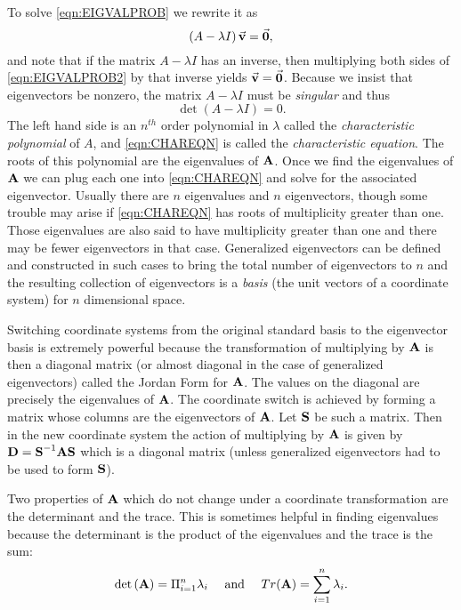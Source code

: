 To solve \eqref{eqn:EIGVALPROB} we rewrite it as
\begin{equation}
   \left(A - \lambda I\right) \vec{\textbf{v}} = \vec{\textbf{0}},
   \label{eqn:EIGVALPROB2}
\end{equation}
and note that if the matrix $A-\lambda I$ has an inverse, 
then multiplying both sides of \eqref{eqn:EIGVALPROB2} by that inverse yields $\vec{\textbf{v}}=\vec{\textbf{0}}$.
Because we insist that eigenvectors be nonzero,
the matrix $A-\lambda I$ must be \emph{singular} and thus
\begin{equation}
   \det\left(A-\lambda I\right) = 0.
   \label{eqn:CHAREQN}
\end{equation}
The left hand side is an $n^{th}$ order polynomial in $\lambda$ called
the \emph{characteristic polynomial}
of $A$, and
\eqref{eqn:CHAREQN} is 
called the \emph{characteristic equation}.
The roots of this polynomial are the eigenvalues of ${\textbf{A}}$.
Once we find the eigenvalues of ${\textbf{A}}$ we can plug each one into \eqref{eqn:CHAREQN}
and solve for the associated eigenvector.  Usually there are $n$ eigenvalues and
$n$ eigenvectors, though some trouble may arise if \eqref{eqn:CHAREQN} has roots
of multiplicity greater than one.  Those eigenvalues are also said to have multiplicity
greater than one and there may be fewer eigenvectors in that case.  Generalized
eigenvectors can be defined and constructed in such cases to bring the total
number of eigenvectors to $n$ and the resulting collection of eigenvectors is 
a \emph{basis} (the unit vectors of a coordinate system) for $n$ dimensional space.

Switching coordinate systems from the original standard basis to the eigenvector
basis is extremely powerful because the transformation of multiplying by ${\textbf{A}}$ 
is then a diagonal matrix (or almost diagonal in the case of generalized 
eigenvectors) called the Jordan Form for ${\textbf{A}}$.  The 
values on the diagonal are precisely the eigenvalues of ${\textbf{A}}$.  The coordinate
switch is achieved by forming a matrix whose columns are the eigenvectors of ${\textbf{A}}$.
Let ${\textbf{S}}$ be such a matrix.  Then in the new coordinate system the action of multiplying
by ${\textbf{A}}$ is given by ${\textbf{D}}={\textbf{S}}^{-1}{\textbf{A}}{\textbf{S}}$ which is a diagonal matrix (unless generalized
eigenvectors had to be used to form ${\textbf{S}}$).

Two properties of ${\textbf{A}}$ which do not change under a coordinate transformation
are the determinant and the trace.  This is sometimes helpful in finding eigenvalues because
the determinant is the product of the eigenvalues and the trace is the sum:
\[
  \det{\left( {{\textbf{A}}} \right)} = \Pi_{i=1}^n \lambda_i  \quad \mbox{ and } \quad Tr{\left( {{\textbf{A}}} \right)}=\sum_{i=1}^n \lambda_i.
\]

